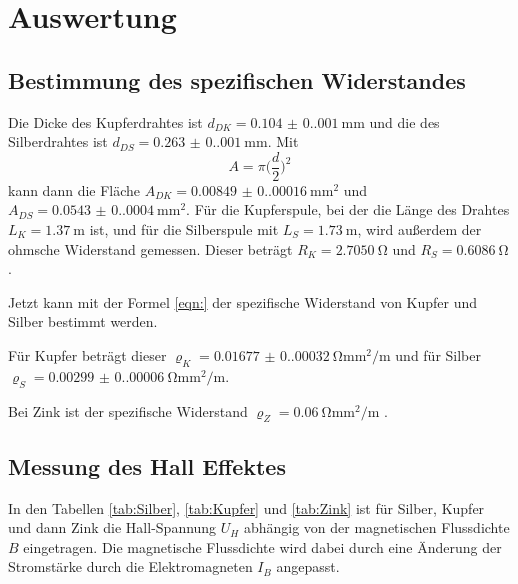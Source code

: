 \section{Auswertung}
\label{sec:Auswertung}

\subsection{Bestimmung des spezifischen Widerstandes}
Die Dicke des Kupferdrahtes ist $d_{DK}=\qty{0.104(0.001)}{\milli\meter}$ und die des Silberdrahtes ist $d_{DS}=\qty{0.263(0.001)}{\milli\meter}$.
Mit 
\begin{equation}
  A=\pi \bigl(\frac{d}{2} \bigr)^2
\label{eqn:Querschnitt}
\end{equation}
\noindent 
kann dann die Fläche $A_{DK}=\qty{0.00849(0.00016)}{\milli\meter\squared}$ und $A_{DS}=\qty{0.0543(0.0004)}{\milli\meter\squared}$.
\noindent Für die Kupferspule, bei der die Länge des Drahtes $L_K=\qty{1.37}{\meter}$ ist, und für die Silberspule mit $L_S=\qty{1.73}{\meter}$, wird außerdem der ohmsche Widerstand gemessen.
Dieser beträgt $R_K=\qty{2.7050}{\ohm}$ und $R_S=\qty{0.6086}{\ohm}$.

\noindent Jetzt kann mit der Formel \ref{eqn:} der spezifische Widerstand von Kupfer und Silber bestimmt werden.


\noindent Für Kupfer beträgt dieser $\varrho_K=\qty{0.01677(0.00032)}{\ohm\milli\meter\squared\per\m}$ und für Silber $\varrho_S=\qty{0.00299(0.00006)}{\ohm\milli\meter\squared\per\m}$.

\noindent Bei Zink ist der spezifische Widerstand $\varrho_Z = \qty{0.06}{\ohm\milli\meter\squared\per\m}$ \cite{Zink}.


\subsection{Messung des Hall Effektes}

In den Tabellen \ref{tab:Silber}, \ref{tab:Kupfer} und \ref{tab:Zink} ist für Silber, Kupfer und dann Zink die Hall-Spannung $U_H$ abhängig von der magnetischen Flussdichte $B$ eingetragen.
Die magnetische Flussdichte wird dabei durch eine Änderung der Stromstärke durch die Elektromagneten $I_B$ angepasst.


